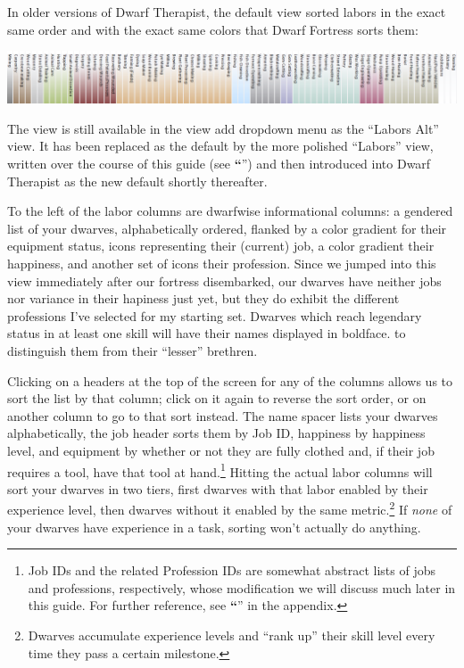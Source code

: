 \documentclass[]{article}
\newcommand{\jump}[1] {\textbf{``\nameref{sec:#1}}''}
\newcommand{\legacy}[1] {
\begin{center}
\colorbox{legacy-content}{
\begin{minipage}[t]{0.95\linewidth}
#1
\end{minipage}
}
\end{center}
}
\begin{document}
\legacy{

In older versions of Dwarf Therapist, the default view sorted labors in the exact
same order and with the exact same colors that Dwarf Fortress sorts them:

\vspace{12pt}
\includegraphics[width=\linewidth]{Sec1Fig6}
\vspace{2pt}

The view is still available in the view add dropdown menu as the ``Labors Alt'' view. It has been
replaced as the default by the more polished ``Labors'' view, written over the course of this guide
(see \jump{Custom Grid Views}) and then introduced into Dwarf Therapist as the new default shortly
thereafter.

}

To the left of the labor columns are dwarfwise informational columns: a gendered list of your dwarves,
alphabetically ordered, flanked by a color gradient for their equipment status, icons representing their
(current) job, a color gradient their happiness, and another set of icons their profession. Since we
jumped into this view immediately after our fortress disembarked, our dwarves have neither jobs nor
variance in their hapiness just yet, but they do exhibit the different professions I've selected for my
starting set. Dwarves which reach legendary status in at least one skill will have their names displayed
in boldface. to distinguish them from their ``lesser'' brethren.

Clicking on a headers at the top of the screen for any of the columns allows us to sort the list by that
column; click on it again to reverse the sort order, or on another column to go to that sort instead.
The name spacer lists your dwarves alphabetically, the job header sorts them by Job ID, happiness by
happiness level, and equipment by whether or not they are fully clothed and,
if their job requires a tool, have that tool at hand.\footnote{\label{footnote} Job IDs and
the related Profession IDs are somewhat abstract lists of jobs and professions, respectively, whose
modification we will discuss much later in this guide. For further reference, see \jump{Profession IDs}
in the appendix.} Hitting the actual labor columns will sort your dwarves in two tiers, first dwarves
with that labor enabled by their experience level, then dwarves without it enabled by the same
metric.\footnote{Dwarves accumulate experience levels and ``rank up'' their skill level every time they
pass a certain milestone.} If \emph{none} of your dwarves have experience in a task, sorting won't
actually do anything.
\end{document}
